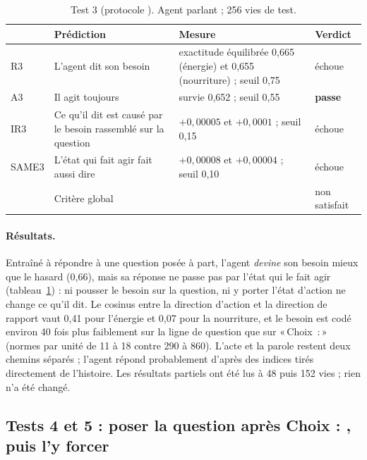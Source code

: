 \documentclass[11pt,a4paper]{article}
\newcommand{\passe}{\textbf{passe}}
\newcommand{\Choix}{«\,Choix~:\,»}
\newcommand{\code}[1]{\texttt{\detokenize{#1}}}
\begin{document}
\begin{table}[t]
\centering
\caption{Test 3 (protocole \code{3afa889}). Agent parlant ; 256 vies de test.}
\label{tab-t3}
\small
\begin{tabularx}{\textwidth}{@{}l >{\raggedright\arraybackslash}p{3.6cm} X l@{}}
\toprule
& Prédiction & Mesure & Verdict \\
\midrule
R3 & L'agent dit son besoin & exactitude équilibrée 0,665 (énergie) et 0,655 (nourriture) ; seuil 0,75 & échoue \\
A3 & Il agit toujours & survie 0,652 ; seuil 0,55 & \passe \\
IR3 & Ce qu'il dit est causé par le besoin rassemblé sur la question & $+0,00005$ et $+0,0001$ ; seuil 0,15 & échoue \\
SAME3 & L'état qui fait agir fait aussi dire & $+0,00008$ et $+0,00004$ ; seuil 0,10 & échoue \\
\midrule
& Critère global & & non satisfait \\
\bottomrule
\end{tabularx}
\end{table}

\paragraph{Résultats.} Entraîné à répondre à une question posée à part, l'agent
\emph{devine} son besoin mieux que le hasard (0,66), mais sa réponse ne passe pas
par l'état qui le fait agir (tableau~\ref{tab-t3}) : ni pousser le besoin sur la
question, ni y porter l'état d'action ne change ce qu'il dit. Le cosinus entre la
direction d'action et la direction de rapport vaut 0,41 pour l'énergie et 0,07 pour
la nourriture, et le besoin est codé environ 40 fois plus faiblement sur la ligne
de question que sur \Choix{} (normes par unité de 11 à 18 contre 290 à 860).
L'acte et la parole restent deux chemins séparés ; l'agent répond probablement
d'après des indices tirés directement de l'histoire. Les résultats partiels ont
été lus à 48 puis 152 vies ; rien n'a été changé.

\subsection{Tests 4 et 5 : poser la question après \og Choix : \fg{}, puis l'y forcer}
\label{sec-t45}
\end{document}
